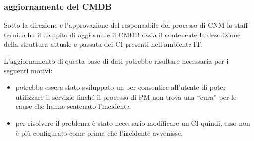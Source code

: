 \subsubsection[Aggiornamento del CMDB]{aggiornamento del CMDB}
Sotto la direzione e l'approvazione del responsabile del processo di \ac{CNM} lo staff tecnico ha il compito di aggiornare il \ac{CMDB} ossia il  contenente la descrizione della struttura attuale e passata dei \ac{CI} presenti nell'ambiente \acs{IT}.

L'aggiornamento di questa base di dati potrebbe risultare necessaria per i seguenti motivi:

\begin{itemize}
\item{potrebbe essere stato sviluppato un  per consentire all'utente di poter utilizzare il servizio finché il processo di \ac{PM} non trova una ``cura'' per le cause che hanno scatenato l'incidente.}
\item{per risolvere il problema è stato necessario modificare un \ac{CI} quindi, esso non è più configurato come prima che l'incidente avvenisse.}
\end{itemize}